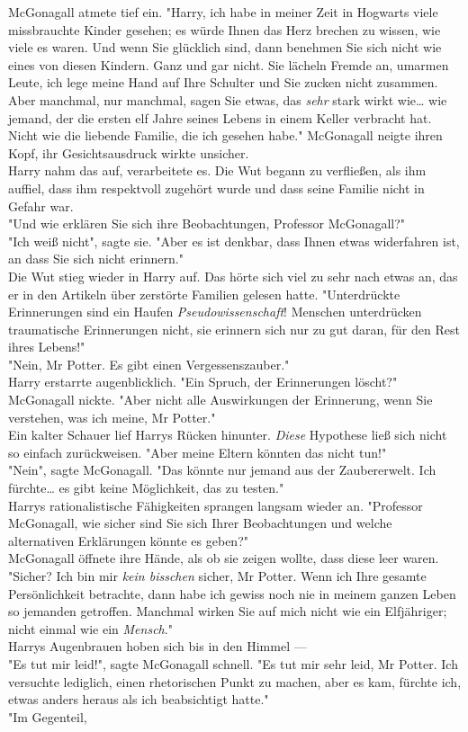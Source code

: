 {McGonagall atmete tief ein. "Harry, ich habe in meiner Zeit in Hogwarts viele missbrauchte Kinder gesehen; es würde Ihnen das Herz brechen zu wissen, wie viele es waren. Und wenn Sie glücklich sind, dann benehmen Sie sich nicht wie eines von diesen Kindern. Ganz und gar nicht. Sie lächeln Fremde an, umarmen Leute, ich lege meine Hand auf Ihre Schulter und Sie zucken nicht zusammen. Aber manchmal, nur manchmal, sagen Sie etwas, das \emph{sehr} stark wirkt wie… wie jemand, der die ersten elf Jahre seines Lebens in einem Keller verbracht hat. Nicht wie die liebende Familie, die ich gesehen habe." McGonagall neigte ihren Kopf, ihr Gesichtsausdruck wirkte unsicher.\\ Harry nahm das auf, verarbeitete es. Die Wut begann zu verfließen, als ihm auffiel, dass ihm respektvoll zugehört wurde und dass seine Familie nicht in Gefahr war.\\ "Und wie erklären Sie sich ihre Beobachtungen, Professor McGonagall?"\\ "Ich weiß nicht", sagte sie. "Aber es ist denkbar, dass Ihnen etwas widerfahren ist, an dass Sie sich nicht erinnern."\\ Die Wut stieg wieder in Harry auf. Das hörte sich viel zu sehr nach etwas an, das er in den Artikeln über zerstörte Familien gelesen hatte. "Unterdrückte Erinnerungen sind ein Haufen \emph{Pseudowissenschaft}! Menschen unterdrücken traumatische Erinnerungen nicht, sie erinnern sich nur zu gut daran, für den Rest ihres Lebens!"\\ "Nein, Mr Potter. Es gibt einen Vergessenszauber."\\ Harry erstarrte augenblicklich. "Ein Spruch, der Erinnerungen löscht?"\\ McGonagall nickte. "Aber nicht alle Auswirkungen der Erinnerung, wenn Sie verstehen, was ich meine, Mr Potter."\\ Ein kalter Schauer lief Harrys Rücken hinunter. \emph{Diese} Hypothese ließ sich nicht so einfach zurückweisen. "Aber meine Eltern könnten das nicht tun!"\\ "Nein", sagte McGonagall. "Das könnte nur jemand aus der Zaubererwelt. Ich fürchte… es gibt keine Möglichkeit, das zu testen."\\ Harrys rationalistische Fähigkeiten sprangen langsam wieder an. "Professor McGonagall, wie sicher sind Sie sich Ihrer Beobachtungen und welche alternativen Erklärungen könnte es geben?"\\ McGonagall öffnete ihre Hände, als ob sie zeigen wollte, dass diese leer waren. "Sicher? Ich bin mir \emph{kein bisschen} sicher, Mr Potter. Wenn ich Ihre gesamte Persönlichkeit betrachte, dann habe ich gewiss noch nie in meinem ganzen Leben so jemanden getroffen. Manchmal wirken Sie auf mich nicht wie ein Elfjähriger; nicht einmal wie ein \emph{Mensch}."\\ Harrys Augenbrauen hoben sich bis in den Himmel ---\\ "Es tut mir leid!", sagte McGonagall schnell. "Es tut mir sehr leid, Mr Potter. Ich versuchte lediglich, einen rhetorischen Punkt zu machen, aber es kam, fürchte ich, etwas anders heraus als ich beabsichtigt hatte."\\ "Im Gegenteil, }
